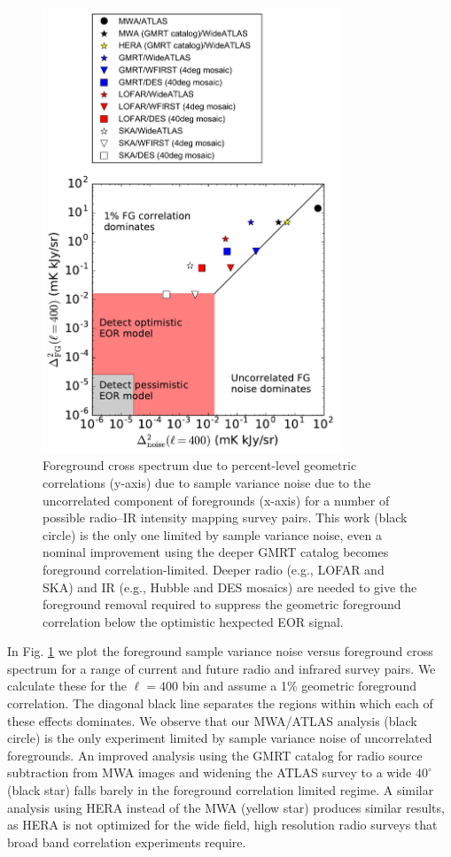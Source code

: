 \documentclass[numberedappendix]{emulateapj}
\begin{document}
\begin{figure}[h]
\centering
\includegraphics[width=3.5in]{noise_vs_corr_expt_study.pdf}
\caption[Experimental design study for 21\,cm--Ly$\alpha$ cross spectrum measurements, weighting foreground cross spectra due to flux correlatians against foreground sample variance.]{Foreground cross spectrum due to percent-level geometric correlations (y-axis) due to sample variance noise due to the uncorrelated component of foregrounds (x-axis) for a number of possible radio--IR intensity mapping survey pairs. This work (black circle) is the only one limited by sample variance noise, even a nominal improvement using the deeper GMRT catalog becomes foreground correlation-limited. Deeper radio (e.g., LOFAR and SKA) and IR (e.g., Hubble and DES mosaics) are needed to give the foreground removal required to suppress the geometric foreground correlation below the optimistic hexpected EOR signal.}
\label{fig:noisecorrstudy}
\end{figure}

In Fig. \ref{fig:noisecorrstudy} we plot the foreground sample variance noise versus foreground cross spectrum for a range of current and future radio and infrared survey pairs. We calculate these for the $\ell=400$ bin and assume a 1\% geometric foreground correlation. The diagonal black line separates the regions within which each of these effects dominates. We observe that our MWA/ATLAS analysis (black circle) is the only experiment limited by sample variance noise of uncorrelated foregrounds. An improved analysis using the GMRT catalog for radio source subtraction from MWA images and widening the ATLAS survey to a wide $40^\circ$ (black star) falls barely in the foreground correlation limited regime. A similar analysis using HERA instead of the MWA (yellow star) produces similar results, as HERA is not optimized for the wide field, high resolution radio surveys that broad band correlation experiments require. 
\end{document}
